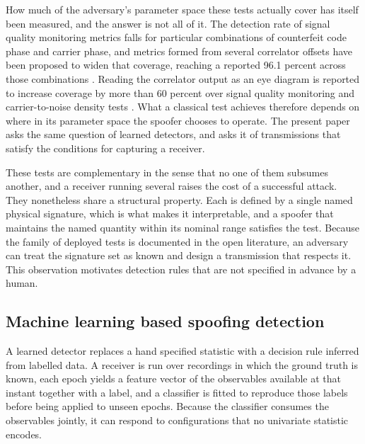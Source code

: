 \documentclass[pdflatex,sn-basic]{sn-jnl}
\theoremstyle{thmstyleone}
\theoremstyle{thmstyletwo}
\theoremstyle{thmstylethree}
\begin{document}
How much of the adversary's parameter space these tests actually cover has itself been
measured, and the answer is not all of it. The detection rate of signal quality monitoring
metrics falls for particular combinations of counterfeit code phase and carrier phase, and
metrics formed from several correlator offsets have been proposed to widen that coverage,
reaching a reported 96.1 percent across those combinations \citep{wu2025musd}. Reading the
correlator output as an eye diagram is reported to increase coverage by more than 60
percent over signal quality monitoring and carrier-to-noise density tests
\citep{wu2025eyediagram}. What a classical test achieves therefore depends on where in its
parameter space the spoofer chooses to operate. The present paper asks the same question of
learned detectors, and asks it of transmissions that satisfy the conditions for capturing a
receiver.

These tests are complementary in the sense that no one of them subsumes another, and a
receiver running several raises the cost of a successful attack. They nonetheless share a
structural property. Each is defined by a single named physical signature, which is what
makes it interpretable, and a spoofer that maintains the named quantity within its nominal
range satisfies the test. Because the family of deployed tests is documented in the open
literature, an adversary can treat the signature set as known and design a transmission
that respects it. This observation motivates detection rules that are not specified in
advance by a human.

\subsection{Machine learning based spoofing detection}
\label{sec:rw_learning}

A learned detector replaces a hand specified statistic with a decision rule inferred from
labelled data. A receiver is run over recordings in which the ground truth is known, each
epoch yields a feature vector of the observables available at that instant together with a
label, and a classifier is fitted to reproduce those labels before being applied to unseen
epochs. Because the classifier consumes the observables jointly, it can respond to
configurations that no univariate statistic encodes.
\end{document}
